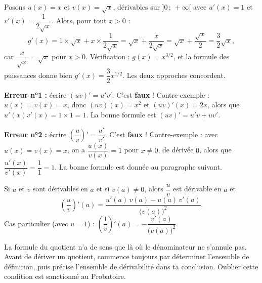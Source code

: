 \documentclass[11pt]{article}
\newcounter{popsec}
\newcounter{popsub}
\newcommand{\courssub}[1]{%
  \stepcounter{popsub}%
  \par\vspace{9pt}\noindent{\popxbold\fontsize{11.5}{13}\selectfont\color{popink}{\color{poporange}\thepopsec.\thepopsub}\hspace{6pt}#1}\par\nopagebreak\vspace{4pt}
}
\begin{document}
\begin{exemplebox}[Produit : $g(x) = x\sqrt{x}$]
Posons $u(x) = x$ et $v(x) = \sqrt{x}$, dérivables sur $]0\,;\,+\infty[$ avec $u'(x) = 1$ et $v'(x) = \dfrac{1}{2\sqrt{x}}$. Alors, pour tout $x > 0$ :
\[
g'(x) = 1\times \sqrt{x} + x\times \frac{1}{2\sqrt{x}} = \sqrt{x} + \frac{x}{2\sqrt{x}} = \sqrt{x} + \frac{\sqrt{x}}{2} = \frac{3}{2}\sqrt{x},
\]
car $\dfrac{x}{\sqrt{x}} = \sqrt{x}$ pour $x > 0$. Vérification : $g(x) = x^{3/2}$, et la formule des puissances donne bien $g'(x) = \dfrac{3}{2}x^{1/2}$. Les deux approches concordent.
\end{exemplebox}

\begin{attention}
\textbf{Erreur n°1 :} écrire $(uv)' = u'v'$. C'est \textbf{faux} ! Contre-exemple : $u(x)=v(x)=x$, donc $(uv)(x) = x^2$ et $(uv)'(x) = 2x$, alors que $u'(x)v'(x) = 1\times 1 = 1$. La bonne formule est $(uv)' = u'v + uv'$.\par
\textbf{Erreur n°2 :} écrire $\left(\dfrac{u}{v}\right)' = \dfrac{u'}{v'}$. C'est \textbf{faux} ! Contre-exemple : avec $u(x)=v(x)=x$, on a $\dfrac{u(x)}{v(x)} = 1$ pour $x\neq 0$, de dérivée $0$, alors que $\dfrac{u'(x)}{v'(x)} = \dfrac{1}{1} = 1$. La bonne formule est donnée au paragraphe suivant.
\end{attention}

\courssub{Dérivée d'un quotient}

\begin{propriete}
Si $u$ et $v$ sont dérivables en $a$ et si $v(a) \neq 0$, alors $\dfrac{u}{v}$ est dérivable en $a$ et
\[
\left(\frac{u}{v}\right)'(a) = \frac{u'(a)\,v(a) - u(a)\,v'(a)}{\bigl(v(a)\bigr)^2}.
\]
Cas particulier (avec $u = 1$) : $\left(\dfrac{1}{v}\right)'(a) = -\dfrac{v'(a)}{\bigl(v(a)\bigr)^2}$.
\end{propriete}

\begin{attention}
La formule du quotient n'a de sens que là où le dénominateur ne s'annule pas. Avant de dériver un quotient, commence toujours par déterminer l'ensemble de définition, puis précise l'ensemble de dérivabilité dans ta conclusion. Oublier cette condition est sanctionné au Probatoire.
\end{attention}
\end{document}
